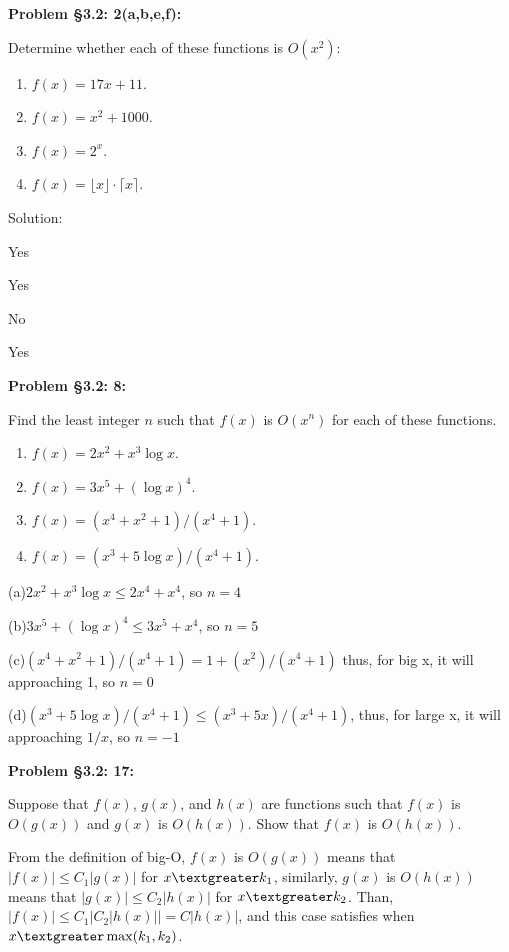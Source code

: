 \documentclass{article}
\newenvironment{problem}[1]
{\begin{mdframed}[default]
\textbf{Problem #1:}
}
{\end{mdframed}
}
\begin{document}
\begin{problem}{\S 3.2: 2(a,b,e,f)}
Determine whether each of these functions is $O(x^2)$:
\begin{enumerate}
\item[(a)] $f(x) = 17x + 11$.
\item[(b)] $f(x) = x^2 + 1000$.
\item[(e)] $f(x) = 2^x$.
\item[(f)] $f(x) = \lfloor x \rfloor \cdot \lceil x \rceil$.
\end{enumerate}
Solution:
\item[(a)] Yes
\item[(b)] Yes
\item[(e)] No
\item[(f)] Yes
\end{problem}
\begin{problem}{\S 3.2: 8}
Find the least integer $n$ such that $f(x)$ is $O(x^n)$ for each of these
functions.
\begin{enumerate}
\item[(a)] $f(x) = 2x^2 + x^3\log{x}$.
\item[(b)] $f(x) = 3x^5 + (\log{x})^4$.
\item[(c)] $f(x) = (x^4+x^2+1)/(x^4+1)$.
\item[(d)] $f(x) = (x^3+5\log{x})/(x^4+1)$.
\end{enumerate}

(a)$2x^2 + x^3\log{x}\leq2x^4+x^4$, so $n=4$

(b)$3x^5 + (\log{x})^4\leq3x^5+x^4$, so $n=5$

(c)$(x^4+x^2+1)/(x^4+1)=1+(x^2)/(x^4+1)$ thus, for big x, it will approaching 1, so $n=0$

(d)$(x^3+5\log{x})/(x^4+1)\leq(x^3+5x)/(x^4+1)$, thus, for large x, it will approaching $1/x$, so $n=-1$
\end{problem}
\begin{problem}{\S 3.2: 17}
Suppose that $f(x)$, $g(x)$, and $h(x)$ are functions such that $f(x)$ is $O(g(x))$
and $g(x)$ is $O(h(x))$. Show that $f(x)$ is $O(h(x))$.

From the definition of big-O, $f(x)$ is $O(g(x))$ means that $|f(x)|\leq C_1|g(x)|$ for $x\textgreater k_1$, similarly,
$g(x)$ is $O(h(x))$ means that $|g(x)|\leq C_2|h(x)|$ for $x\textgreater k_2$.
Than, $|f(x)|\leq C_1|C_2|h(x)||=C|h(x)|$, and this case satisfies when $x \textgreater \max(k_1, k_2)$.
\end{problem}
\end{document}
